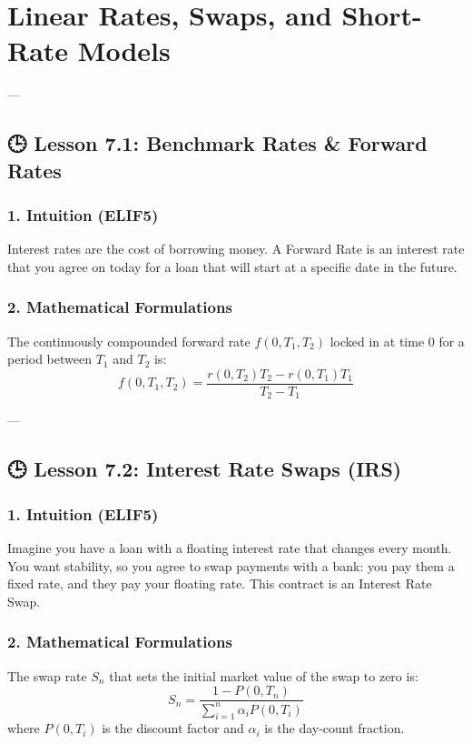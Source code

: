 \documentclass[11pt,oneside]{book}
\begin{document}
\newpage

\chapter{Linear Rates, Swaps, and Short-Rate Models}

---

\section{🕒 Lesson 7.1: Benchmark Rates \& Forward Rates}

\subsection{1. Intuition (ELIF5)}
Interest rates are the cost of borrowing money. A Forward Rate is an interest rate that you agree on today for a loan that will start at a specific date in the future.

\subsection{2. Mathematical Formulations}
The continuously compounded forward rate $f(0, T_1, T_2)$ locked in at time 0 for a period between $T_1$ and $T_2$ is:
$$f(0, T_1, T_2) = \frac{r(0, T_2) T_2 - r(0, T_1) T_1}{T_2 - T_1}$$

---

\section{🕒 Lesson 7.2: Interest Rate Swaps (IRS)}

\subsection{1. Intuition (ELIF5)}
Imagine you have a loan with a floating interest rate that changes every month. You want stability, so you agree to swap payments with a bank: you pay them a fixed rate, and they pay your floating rate. This contract is an Interest Rate Swap.

\subsection{2. Mathematical Formulations}
The swap rate $S_n$ that sets the initial market value of the swap to zero is:
$$S_n = \frac{1 - P(0, T_n)}{\sum_{i=1}^n \alpha_i P(0, T_i)}$$
where $P(0, T_i)$ is the discount factor and $\alpha_i$ is the day-count fraction.
\end{document}
